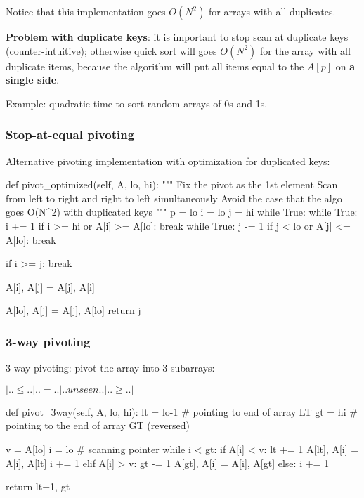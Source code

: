 Notice that this implementation goes $O(N^2)$ for arrays with all duplicates.

\textbf{Problem with duplicate keys}: it is important to stop scan at duplicate
keys (counter-intuitive); otherwise quick sort will goes $O(N^2)$ for the
array with all duplicate items, because the algorithm will put all items
equal to the $A[p]$ on \textbf{a single side}. 

Example: quadratic time to sort random arrays of 0s and 1s.

\subsubsection{Stop-at-equal pivoting}
Alternative pivoting implementation with optimization for duplicated keys:
\begin{python}
def pivot_optimized(self, A, lo, hi):
    """
    Fix the pivot as the 1st element
    Scan from left to right and right to left simultaneously
    Avoid the case that the algo goes O(N^2) with duplicated keys
    """
    p = lo
    i = lo
    j = hi
    while True:
        while True:
            i += 1
            if i >= hi or A[i] >= A[lo]:
                break
        while True:
            j -= 1
            if j < lo or A[j] <= A[lo]:
                break

        if i >= j:
            break

        A[i], A[j] = A[j], A[i]

    A[lo], A[j] = A[j], A[lo]
    return j

\end{python}
\subsubsection{3-way pivoting}
3-way pivoting: pivot the array into 3 subarrays: 

$|..\leq..|..=..|..unseen..|..\geq..|$ 
\begin{python}
def pivot_3way(self, A, lo, hi):
    lt = lo-1  # pointing to end of array LT
    gt = hi  # pointing to the end of array GT (reversed)

    v = A[lo]
    i = lo  # scanning pointer
    while i < gt:
        if A[i] < v:
            lt += 1
            A[lt], A[i] = A[i], A[lt]
            i += 1
        elif A[i] > v:
            gt -= 1
            A[gt], A[i] = A[i], A[gt]
        else:
            i += 1

    return lt+1, gt
\end{python}

